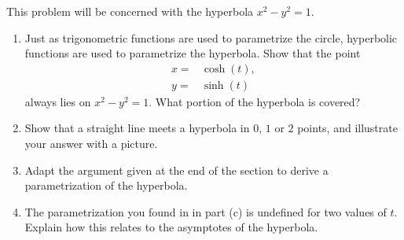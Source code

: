 \begin{exercise}{5}
    This problem will be concerned with the hyperbola $x^2 - y^2 = 1$.
    \begin{enumerate}
        \item Just as trigonometric functions are used to parametrize the circle, hyperbolic functions are used to parametrize the hyperbola. Show that the point
        \begin{align*}
            x= & \cosh(t),\\
            y= & \sinh(t)
        \end{align*}
        always lies on $x^2 - y^2 = 1$. 
        What portion of the hyperbola is covered?
        \item Show that a straight line meets a hyperbola in $0$, $1$ or $2$ points, and illustrate your answer with a picture.
        \item Adapt the argument given at the end of the section to derive a parametrization of the hyperbola.
        \item The parametrization you found in in part (c) is undefined for two values of $t$. 
        Explain how this relates to the asymptotes of the hyperbola.
    \end{enumerate}
\end{exercise}
